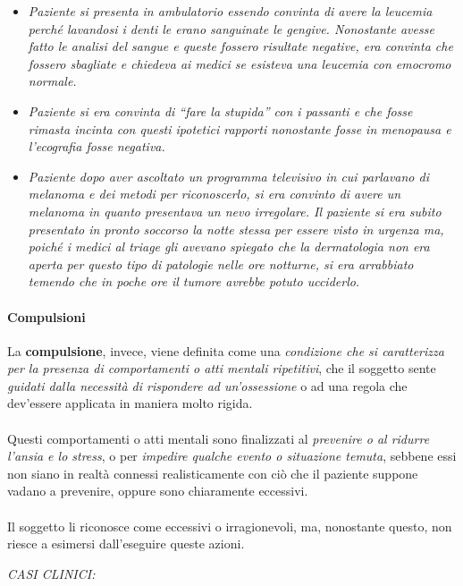 \begin{itemize}
{  è davvero venuto il dubbio di esserlo.}
\item
  \emph{Paziente si presenta in ambulatorio essendo convinta di avere la
  leucemia perché lavandosi i denti le erano sanguinate le gengive.
  Nonostante avesse fatto le analisi del sangue e queste fossero
  risultate negative, era convinta che fossero sbagliate e chiedeva ai
  medici se esisteva una leucemia con emocromo normale.}
\item
  \emph{Paziente si era convinta di ``fare la stupida'' con i passanti e
  che fosse rimasta incinta con questi ipotetici rapporti nonostante
  fosse in menopausa e l'ecografia fosse negativa.}
\item
  \emph{Paziente dopo aver ascoltato un programma televisivo in cui
  parlavano di melanoma e dei metodi per riconoscerlo, si era convinto
  di avere un melanoma in quanto presentava un nevo irregolare. Il
  paziente si era subito presentato in pronto soccorso la notte stessa
  per essere visto in urgenza ma, poiché i medici al triage gli avevano
  spiegato che la dermatologia non era aperta per questo tipo di
  patologie nelle ore notturne, si era arrabbiato temendo che in poche
  ore il tumore avrebbe potuto ucciderlo. }
\end{itemize}

\paragraph{Compulsioni}

La \textbf{compulsione}, invece, viene definita come una
\emph{condizione che si caratterizza per la presenza di comportamenti o
atti mentali ripetitivi}, che il soggetto sente \emph{guidati dalla
necessità di rispondere ad un'ossessione} o ad una regola che dev'essere
applicata in maniera molto rigida.
\\\\
Questi comportamenti o atti mentali sono finalizzati al \emph{prevenire
o al ridurre l'ansia e lo stress}, o per \emph{impedire qualche evento o
situazione temuta}, sebbene essi non siano in realtà connessi
realisticamente con ciò che il paziente suppone vadano a prevenire,
oppure sono chiaramente eccessivi.
\\\\
Il soggetto li riconosce come eccessivi o irragionevoli, ma, nonostante
questo, non riesce a esimersi dall'eseguire queste azioni.

\emph{\emph{CASI CLINICI:}}

